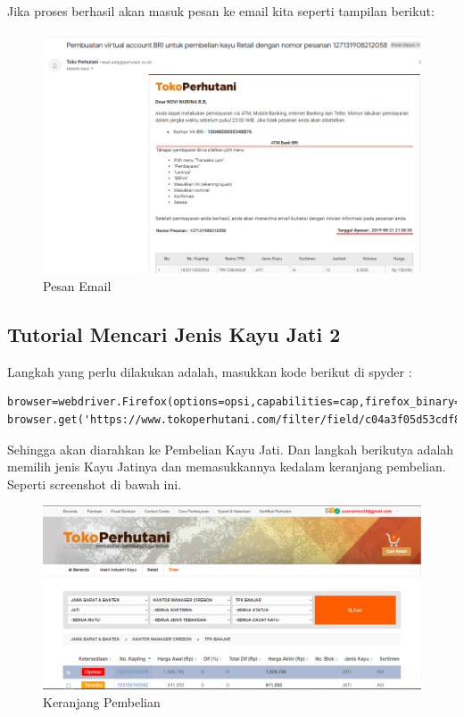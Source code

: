 Jika proses berhasil akan masuk pesan ke email kita seperti tampilan berikut:
\begin{figure}[h]
	\centering
	\includegraphics[scale=0.30]{figures/emailbayar}
	\caption{Pesan Email}
\end{figure}

\newpage
\subsection {Tutorial Mencari Jenis Kayu Jati 2}
Langkah yang perlu dilakukan adalah, masukkan kode berikut di spyder :
\begin{verbatim}
browser=webdriver.Firefox(options=opsi,capabilities=cap,firefox_binary=binary)
browser.get('https://www.tokoperhutani.com/filter/field/c04a3f05d53cdf8f8ac5cf643ba2504bd2f46bd0bb9a60877d640d51d96a6af5#')
\end{verbatim}

Sehingga akan diarahkan ke Pembelian Kayu Jati. Dan langkah berikutya adalah memilih jenis Kayu Jatinya dan memasukkannya kedalam keranjang pembelian. Seperti screenshot di bawah ini.
\begin{figure}[h]
	\centering
	\includegraphics[scale=0.25]{figures/T5_cart}
	\caption{Keranjang Pembelian}
\end{figure}

